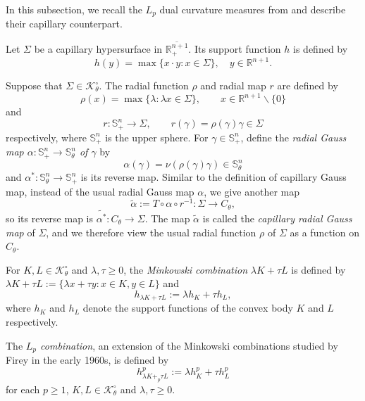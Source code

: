 \documentclass[11pt]{amsart}
\newcommand{\uS}{\mathbb{S}^{n}}
\numberwithin{equation} {section}
\numberwithin{equation}{section}
\begin{document}
In this subsection, we recall the $L_p$ dual curvature measures from \cite{LYZ18} and describe their capillary counterpart.

Let $\Sigma$ be a capillary hypersurface in $\overline{\mathbb{R}^{n+1}_+}$. Its support function $h$ is defined by
$$h (y) = \max \{ x\cdot y : x\in \Sigma\}, \quad y\in\mathbb{R}^{n+1}.$$

Suppose that $\Sigma\in \mathcal{K}_{\theta}^{\circ}$. The radial function $\rho$ and radial map $r$ are defined by
\begin{equation*}
    \rho (x) = \max\{\lambda: \lambda x\in \Sigma\}, \qquad x\in \mathbb{R}^{n+1}\backslash\{0\}
\end{equation*}
and
\begin{equation*}
    r: \uS_+\to \Sigma, \qquad r(\gamma)=\rho(\gamma)\gamma \in\Sigma
\end{equation*}
respectively, where $\uS_+$ is the upper sphere. For $\gamma\in\uS_+$, define the \emph{radial Gauss map $\alpha:\uS_+\to \uS_{\theta}$ of $\gamma$} by 
\begin{equation*}
    \alpha(\gamma) = \nu(\rho (\gamma)\gamma)\in \uS_{\theta}
\end{equation*}
and $\alpha^{\ast}: \uS_{\theta} \to \uS_+$ is its reverse map. Similar to the definition of capillary Gauss map, instead of the usual radial Gauss map $\alpha$, we give another map 
\begin{equation*}
    \widetilde{\alpha}:= T\circ \alpha \circ r^{-1}  : \Sigma \to C_{\theta},
\end{equation*}
so its reverse map is $\widetilde{\alpha^{\ast}}: C_{\theta} \to \Sigma$. The map $\widetilde{\alpha}$ is called the \emph{capillary radial Gauss map} of $\Sigma$, and we therefore view the usual radial function $\rho$ of $\Sigma$ as a function on $C_{\theta}$.

For $K,L\in\mathcal{K}^{\circ}_{\theta}$ and $\lambda, \tau\geq 0$, the \emph{Minkowski combination} $\lambda K+ \tau L$ is defined by $\lambda K+ \tau L :=\{\lambda x+ \tau y: x\in K, y\in L\}$ and 
$$h_{\lambda K+ \tau L}:= \lambda h_{K} + \tau h_{L},$$
where $h_K$ and $h_L$ denote the support functions of the convex body $K$ and $L$ respectively.

The \emph{$L_p$ combination}, an extension of the Minkowski combinations studied by Firey in the early 1960s, is defined by
\begin{equation*}
    h^p_{\lambda K+_{p}\tau L }:= \lambda h_{K}^p + \tau h_{L}^p
\end{equation*}
for each $p\geq 1$, $K, L\in\mathcal{K}^{\circ}_{\theta}$ and $\lambda, \tau \geq 0$. 
\end{document}
